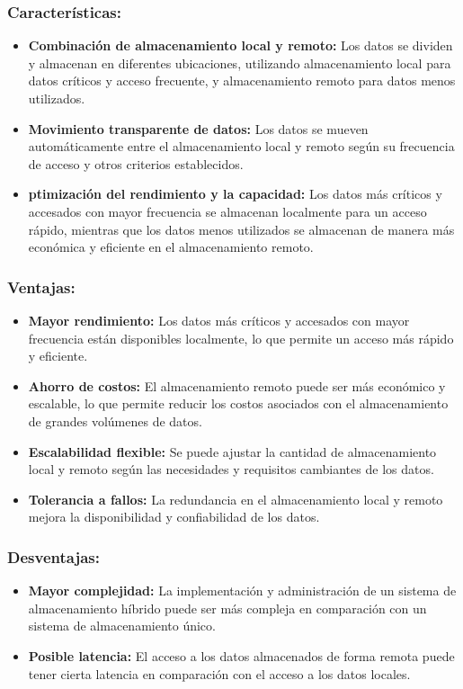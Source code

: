 \subsubsection{Características:}
\noindent
\begin{itemize}
	\item \textbf{Combinación de almacenamiento local y remoto:} Los datos se dividen y almacenan en diferentes ubicaciones, utilizando almacenamiento local para datos críticos y acceso frecuente, y almacenamiento remoto para datos menos utilizados.
	\item \textbf{Movimiento transparente de datos:} Los datos se mueven automáticamente entre el almacenamiento local y remoto según su frecuencia de acceso y otros criterios establecidos.
	\item \textbf{ptimización del rendimiento y la capacidad:} Los datos más críticos y accesados con mayor frecuencia se almacenan localmente para un acceso rápido, mientras que los datos menos utilizados se almacenan de manera más económica y eficiente en el almacenamiento remoto.
\end{itemize}

\subsubsection{Ventajas:}
\noindent
\begin{itemize}
	\item \textbf{Mayor rendimiento:} Los datos más críticos y accesados con mayor frecuencia están disponibles localmente, lo que permite un acceso más rápido y eficiente.
	\item \textbf{Ahorro de costos:} El almacenamiento remoto puede ser más económico y escalable, lo que permite reducir los costos asociados con el almacenamiento de grandes volúmenes de datos.
	\item \textbf{Escalabilidad flexible:} Se puede ajustar la cantidad de almacenamiento local y remoto según las necesidades y requisitos cambiantes de los datos.
	\item \textbf{Tolerancia a fallos:} La redundancia en el almacenamiento local y remoto mejora la disponibilidad y confiabilidad de los datos.
\end{itemize}

\subsubsection{Desventajas:}
\noindent
\begin{itemize}
	\item \textbf{Mayor complejidad:} La implementación y administración de un sistema de almacenamiento híbrido puede ser más compleja en comparación con un sistema de almacenamiento único.
	\item \textbf{Posible latencia:} El acceso a los datos almacenados de forma remota puede tener cierta latencia en comparación con el acceso a los datos locales.
\end{itemize}

